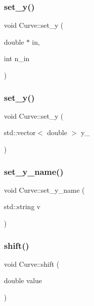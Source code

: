 \subsubsection{\texorpdfstring{set\+\_\+y()}{set\_y()}\hspace{0.1cm}{\footnotesize\ttfamily [1/2]}}
{\footnotesize\ttfamily void Curve\+::set\+\_\+y (\begin{DoxyParamCaption}\item[{double $\ast$}]{in,  }\item[{int}]{n\+\_\+in }\end{DoxyParamCaption})}

\mbox{\label{class_curve_a4c87680fa04d360bc5094112fe9c91b1}} 
\subsubsection{\texorpdfstring{set\+\_\+y()}{set\_y()}\hspace{0.1cm}{\footnotesize\ttfamily [2/2]}}
{\footnotesize\ttfamily void Curve\+::set\+\_\+y (\begin{DoxyParamCaption}\item[{std\+::vector$<$ double $>$}]{y\+\_\+ }\end{DoxyParamCaption})}

\mbox{\label{class_curve_a562c865538b8f3ea74cd195d5644bb4f}} 
\subsubsection{\texorpdfstring{set\+\_\+y\+\_\+name()}{set\_y\_name()}}
{\footnotesize\ttfamily void Curve\+::set\+\_\+y\+\_\+name (\begin{DoxyParamCaption}\item[{std\+::string}]{v }\end{DoxyParamCaption})}

\mbox{\label{class_curve_aaefb5086df5ad824628b9aaef7f27714}} 
\subsubsection{\texorpdfstring{shift()}{shift()}}
{\footnotesize\ttfamily void Curve\+::shift (\begin{DoxyParamCaption}\item[{double}]{value }\end{DoxyParamCaption})}

